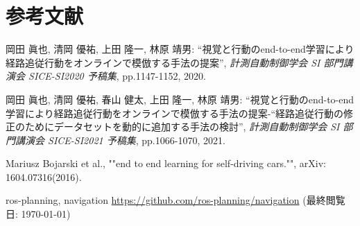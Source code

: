 \chapter*{参考文献}

岡田 眞也, 清岡 優祐, 上田 隆一, 林原 靖男: ``視覚と行動のend-to-end学習により経路追従行動をオンラインで模倣する手法の提案'', \textit{計測自動制御学会 SI 部門講演会 SICE-SI2020 予稿集}, pp.1147-1152, 2020.

岡田 眞也, 清岡 優祐, 春山 健太, 上田 隆一, 林原 靖男: ``視覚と行動のend-to-end学習により経路追従行動をオンラインで模倣する手法の提案-“経路追従行動の修正のためにデータセットを動的に追加する手法の検討'', \textit{計測自動制御学会 SI 部門講演会 SICE-SI2021 予稿集}, pp.1066-1070, 2021.

Mariusz Bojarski et al., ""end to end learning for self-driving cars."", arXiv: 1604.07316(2016). 

ros-planning, navigation
\url{https://github.com/ros-planning/navigation}
(最終閲覧日: \today)

